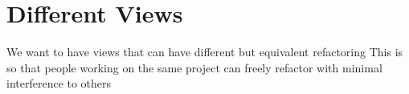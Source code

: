 
\chapter{Different Views}
We want to have views that can have different but equivalent refactoring
This is so that people working on the same project can freely refactor with minimal interference to others

